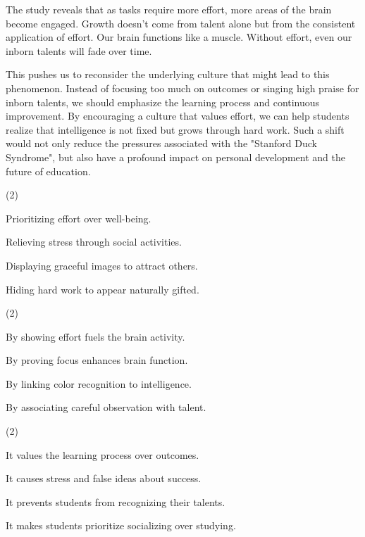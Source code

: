 \documentclass{英语试卷}
\begin{document}
\par The study reveals that as tasks require more effort, more areas of the brain become engaged. Growth doesn't come from talent alone but from the consistent application of effort. Our brain functions like a muscle. Without effort, even our inborn talents will fade over time.\par
\par This pushes us to reconsider the underlying culture that might lead to this phenomenon. Instead of focusing too much on outcomes or singing high praise for inborn talents, we should emphasize the learning process and continuous improvement. By encouraging a culture that values effort, we can help students realize that intelligence is not fixed but grows through hard work. Such a shift would not only reduce the pressures associated with the "Stanford Duck Syndrome", but also have a profound impact on personal development and the future of education.\par
{}
\begin{choices}(2)
  \item Prioritizing effort over well-being.
  \item Relieving stress through social activities.
  \item Displaying graceful images to attract others.
  \item Hiding hard work to appear naturally gifted.
\end{choices}
\begin{choices}(2)
  \item By showing effort fuels the brain activity.
  \item By proving focus enhances brain function.
  \item By linking color recognition to intelligence.
  \item By associating careful observation with talent.
\end{choices}
\begin{choices}(2)
  \item It values the learning process over outcomes.
  \item It causes stress and false ideas about success.
  \item It prevents students from recognizing their talents.
  \item It makes students prioritize socializing over studying.
\end{choices}
\end{document}
